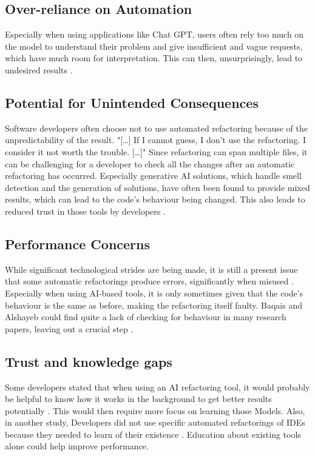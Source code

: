 \subsection{Over-reliance on Automation}
Especially when using applications like Chat GPT, users often rely too much on the model to understand their problem and give insufficient and vague requests, which have much room for interpretation. This can then, unsurprisingly, lead to undesired results \cite{alomar2024refactor}.

\subsection{Potential for Unintended Consequences}
Software developers often choose not to use automated refactoring because of the unpredictability of the result. 
"[…] If I cannot guess, I don't use the refactoring. I consider it not worth the trouble. […]" \cite{usedisuserefactor} Since refactoring can span multiple files, it can be challenging for a developer to check all the changes after an automatic refactoring has occurred.
Especially generative AI solutions, which handle smell detection and the generation of solutions, have often been found to provide mixed results, which can lead to the code's behaviour being changed. This also leads to reduced trust in those tools by developers \cite{10.1145/3397481.3450656}.

\subsection{Performance Concerns}
While significant technological strides are being made, it is still a present issue that some automatic refactorings produce errors, significantly when misused \cite{7833023}. 
Especially when using AI-based tools, it is only sometimes given that the code's behaviour is the same as before, making the refactoring itself faulty. Baqais and Alshayeb could find quite a lack of checking for behaviour in many research papers, leaving out a crucial step \cite{baqais2020automatic}.

\subsection{Trust and knowledge gaps}
Some developers stated that when using an AI refactoring tool, it would probably be helpful to know how it works in the background to get better results potentially \cite{10.1145/3397481.3450656}.
This would then require more focus on learning those Models. Also, in another study, Developers did not use specific automated refactorings of IDEs because they needed to learn of their existence \cite{negara2013comparative}.
Education about existing tools alone could help improve performance.
